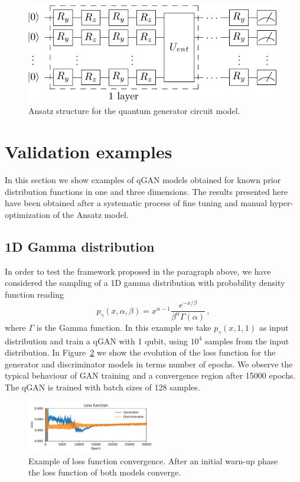 \documentclass[twocolumn,preprintnumbers,superscriptaddress]{revtex4-2}
\begin{document}
\begin{figure}
  \includegraphics[width=1.0\columnwidth]{plots/ansatz1.pdf}
  \caption{\label{fig:circuit}Ansatz structure for the quantum generator circuit model.}
\end{figure}

\section{Validation examples}
\label{sec:validation}

In this section we show examples of qGAN models obtained for known prior
distribution functions in one and three dimensions. The results presented here
have been obtained after a systematic process of fine tuning and manual
hyper-optimization of the Ansatz model.

\subsection{1D Gamma distribution}

In order to test the framework proposed in the paragraph above, we have
considered the sampling of a 1D gamma distribution with probability density
function reading
\begin{equation}
  p_\gamma (x, \alpha, \beta) = x^{\alpha-1} \frac{e^{-x/\beta}}{\beta^\alpha \Gamma(\alpha)}\,,
\end{equation}
where $\Gamma$ is the Gamma function. In this example we take $p_\gamma (x, 1, 1)$ as input distribution
and train a qGAN with 1 qubit, using $10^4$ samples from the input distribution.
%
In Figure~\ref{fig:loss} we show the evolution of the loss function for the
generator and discriminator models in terms number of epochs. We observe the
typical behaviour of GAN training and a convergence region after 15000 epochs.
%
The qGAN is trained with batch sizes of 128 samples.

\begin{figure}
  \includegraphics[width=0.5\textwidth]{plots/1Dgamma/1Dgamma_loss.pdf}
  \caption{\label{fig:loss}Example of loss function convergence. After an
  initial warn-up phase the loss function of both models converge.}
\end{figure}
\end{document}

